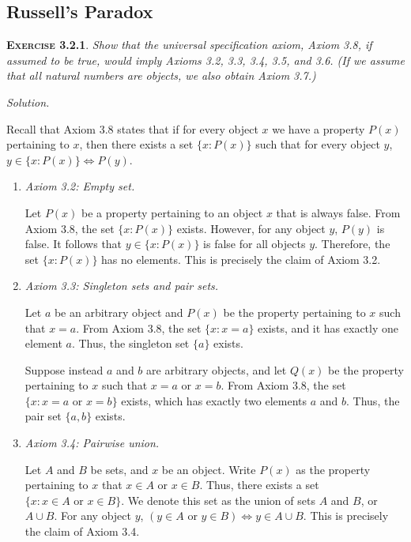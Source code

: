 \documentclass[12pt]{article}
\theoremstyle{remark}
\newenvironment{exer}[2]{
    \noindent \setlength{\parskip}{1em}%
    \textsc{\textbf{Exercise #1}}. \textit{#2} \par
    \noindent \textit{Solution.} %
}{\bigskip}
\begin{document}
\subsection{Russell's Paradox}

\begin{exer}{3.2.1}{
    Show that the universal specification axiom, Axiom 3.8, if assumed to be true, would imply Axioms 3.2, 3.3, 3.4, 3.5, and 3.6.
    (If we assume that all natural numbers are objects, we also obtain Axiom 3.7.)
}
    Recall that Axiom 3.8 states that if for every object $x$ we have a property $P(x)$ pertaining to $x$, then there exists a set $\{ x : P(x) \}$ such that for every object $y$, $y \in \{x : P(x) \} \iff P(y)$.
    
    \begin{enumerate}[topsep=0mm, label=(\alph*)]
        \item \textit{Axiom 3.2: Empty set.}
        
            Let $P(x)$ be a property pertaining to an object $x$ that is always false.
            From Axiom 3.8, the set $\{ x : P(x) \}$ exists.
            However, for any object $y$, $P(y)$ is false.
            It follows that $y \in \{ x : P(x) \}$ is false for all objects $y$.
            Therefore, the set $\{ x : P(x) \}$ has no elements.
            This is precisely the claim of Axiom 3.2.
            
        \item \textit{Axiom 3.3: Singleton sets and pair sets.}
        
            Let $a$ be an arbitrary object and $P(x)$ be the property pertaining to $x$ such that $x = a$.
            From Axiom 3.8, the set $\{ x : x = a \}$ exists, and it has exactly one element $a$.
            Thus, the singleton set $\{ a \}$ exists.
                   
            Suppose instead $a$ and $b$ are arbitrary objects, and let $Q(x)$ be the property pertaining to $x$ such that $x = a$ or $x = b$.
            From Axiom 3.8, the set $\{ x : x = a \text{ or } x = b\}$ exists, which has exactly two elements $a$ and $b$.
            Thus, the pair set $\{ a, b \}$ exists.
            
        \item \textit{Axiom 3.4: Pairwise union.}
        
            Let $A$ and $B$ be sets, and $x$ be an object.
            Write $P(x)$ as the property pertaining to $x$ that $x \in A$ or $x \in B$.
            Thus, there exists a set $\{x : x \in A \text{ or } x \in B \}$.        
            We denote this set as the union of sets $A$ and $B$, or $A \cup B$.
            For any object $y$, $(y \in A \text{ or } y \in B) \iff y \in A \cup B$.
            This is precisely the claim of Axiom 3.4.
            

\end{enumerate}
\end{exer}
\end{document}
